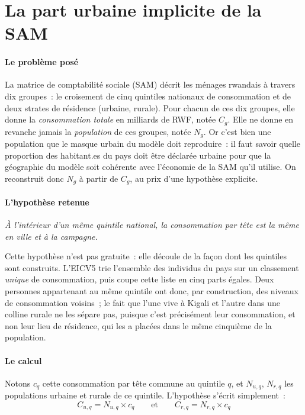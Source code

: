 \documentclass[12pt,a4paper,french]{report}
\begin{document}
		\section{La part urbaine implicite de la SAM}
		\label{subsubsec:annexe_part_urbaine_sam}

		\paragraph{Le problème posé}
		La matrice de comptabilité sociale (SAM) décrit les ménages rwandais à travers dix groupes~: le croisement de cinq quintiles nationaux de consommation et de deux strates de résidence (urbaine, rurale). Pour chacun de ces dix groupes, elle donne la \emph{consommation totale} en milliards de RWF, notée $C_g$. Elle ne donne en revanche jamais la \emph{population} de ces groupes, notée $N_g$. Or c'est bien une population que le masque urbain du modèle doit reproduire~: il faut savoir quelle proportion des habitant.es du pays doit être déclarée urbaine pour que la géographie du modèle soit cohérente avec l'économie de la SAM qu'il utilise. On reconstruit donc $N_g$ à partir de $C_g$, au prix d'une hypothèse explicite.

		\paragraph{L'hypothèse retenue}
		\emph{À l'intérieur d'un même quintile national, la consommation par tête est la même en ville et à la campagne.}

		Cette hypothèse n'est pas gratuite~: elle découle de la façon dont les quintiles sont construits. L'EICV5 trie l'ensemble des individus du pays sur un classement \emph{unique} de consommation, puis coupe cette liste en cinq parts égales. Deux personnes appartenant au même quintile ont donc, par construction, des niveaux de consommation voisins~; le fait que l'une vive à Kigali et l'autre dans une colline rurale ne les sépare pas, puisque c'est précisément leur consommation, et non leur lieu de résidence, qui les a placées dans le même cinquième de la population.

		\paragraph{Le calcul}
		Notons $c_q$ cette consommation par tête commune au quintile $q$, et $N_{u,q}$, $N_{r,q}$ les populations urbaine et rurale de ce quintile. L'hypothèse s'écrit simplement~:
		\begin{equation}
			C_{u,q} = N_{u,q} \times c_q
			\qquad\text{et}\qquad
			C_{r,q} = N_{r,q} \times c_q
			\label{eq:sam_conso_par_tete}
		\end{equation}
\end{document}
